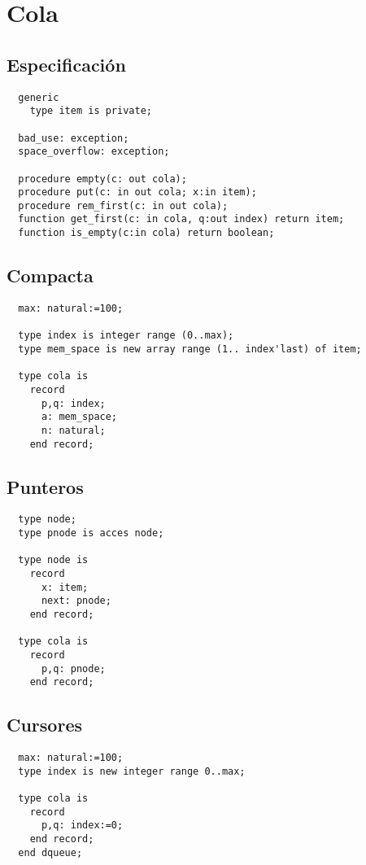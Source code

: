 \documentclass[a4paper,10pt]{book}
\begin{document}
\section{Cola}

\subsection{Especificación}
\begin{lstlisting}
  generic
    type item is private;
  
  bad_use: exception;
  space_overflow: exception;
  
  procedure empty(c: out cola);
  procedure put(c: in out cola; x:in item);
  procedure rem_first(c: in out cola);
  function get_first(c: in cola, q:out index) return item;
  function is_empty(c:in cola) return boolean;
\end{lstlisting}


\subsection{Compacta}

\begin{lstlisting}
  max: natural:=100;
  
  type index is integer range (0..max);
  type mem_space is new array range (1.. index'last) of item;
  
  type cola is
    record
      p,q: index;
      a: mem_space;
      n: natural;
    end record;
\end{lstlisting}

\subsection{Punteros}
\begin{lstlisting}
  type node;
  type pnode is acces node;
  
  type node is
    record
      x: item;
      next: pnode;
    end record;
    
  type cola is
    record
      p,q: pnode;
    end record;
\end{lstlisting}

\subsection{Cursores}
\begin{lstlisting}
  max: natural:=100;
  type index is new integer range 0..max;
  
  type cola is
    record
      p,q: index:=0;
    end record;
  end dqueue;
\end{lstlisting}
\end{document}
